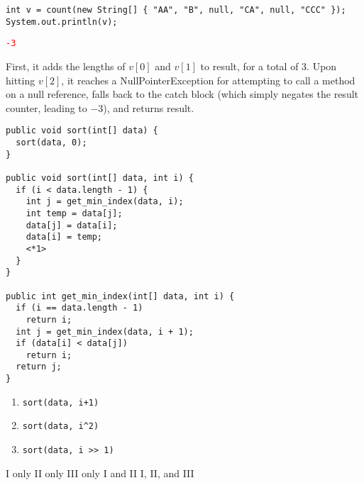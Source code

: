 \documentclass[11pt,addpoints]{exam}
\begin{document}
\begin{questions}
\begin{minipage}{\textwidth}
\begin{verbatim}
int v = count(new String[] { "AA", "B", null, "CA", null, "CCC" });
System.out.println(v);

\end{verbatim}

\begin{choices}
  \choice \textcolor{red}{\tt -3}
   \\
\end{choices}
\end{minipage}

First, it adds the lengths of $v[0]$ and $v[1]$ to result, for a total of 3. Upon hitting $v[2]$, it reaches a NullPointerException for attempting to call a method on a null reference, falls back to the catch block (which simply negates the result counter, leading to $-3$), and returns result.

\begin{minipage}{\textwidth}


\begin{verbatim}
public void sort(int[] data) {
  sort(data, 0);
}

public void sort(int[] data, int i) {
  if (i < data.length - 1) {
    int j = get_min_index(data, i);
    int temp = data[j];
    data[j] = data[i];
    data[i] = temp;
    <*1>
  }
}

public int get_min_index(int[] data, int i) {
  if (i == data.length - 1)
    return i;
  int j = get_min_index(data, i + 1);
  if (data[i] < data[j])
    return i;
  return j;
}
\end{verbatim}

\begin{enumerate}[label=\Roman*.]
  \item {\tt sort(data, i+1)}
  \item {\tt sort(data, i\textasciicircum2)}
  \item {\tt sort(data, i >> 1)} \\
\end{enumerate}

\begin{choices}
  \choice I only
  \choice II only
  \choice III only
  \choice I and II
  \choice I, II, and III \\
\end{choices}


\end{minipage}
\end{questions}
\end{document}
